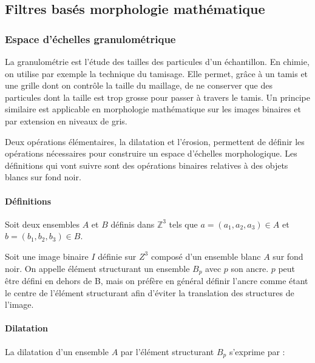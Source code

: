 \subsection{Filtres basés morphologie mathématique}
\subsubsection{Espace d'échelles granulométrique}
\label{sec:EA:rehaussement:echelle:granulometrie}

La granulométrie est l'étude des tailles des particules d'un échantillon. En chimie, on utilise par exemple la technique du tamisage. Elle permet, grâce à un tamis et une grille dont on contrôle la taille du maillage, de ne conserver que des particules dont la taille est trop grosse pour passer à travers le tamis. Un principe similaire est applicable en morphologie mathématique sur les images binaires et par extension en niveaux de gris. 


Deux opérations élémentaires, la dilatation et l'érosion, permettent de définir les opérations nécessaires pour construire un espace d'échelles morphologique. Les définitions qui vont suivre sont des opérations binaires relatives à des objets blancs sur fond noir.

\paragraph{Définitions}

Soit deux ensembles $A$ et $B$ définis dans $\mathbb{Z}^3$ tels que $a=(a_1,a_2,a_3)  \in A$ et $b=(b_1,b_2,b_3) \in B$.

Soit une image binaire $I$ définie sur $Z^3$ composé d'un ensemble blanc $A$ sur fond noir. On appelle élément structurant un ensemble $B_p$ avec $p$ son ancre. $p$ peut être défini en dehors de B, mais on préfère en général définir l'ancre comme étant le centre de l'élément structurant afin d'éviter la translation des structures de l'image.

\paragraph{Dilatation}

La dilatation d'un ensemble $A$ par l'élément structurant $B_p$ s'exprime par :

